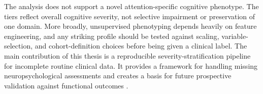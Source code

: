 The analysis does not support a novel attention-specific cognitive phenotype. The tiers reflect overall cognitive severity, not selective impairment or preservation of one domain. More broadly, unsupervised phenotyping depends heavily on feature engineering, and any striking profile should be tested against scaling, variable-selection, and cohort-definition choices before being given a clinical label. The main contribution of this thesis is a reproducible severity-stratification pipeline for incomplete routine clinical data. It provides a framework for handling missing neuropsychological assessments and creates a basis for future prospective validation against functional outcomes \parencite{maas2017traumatic, corrigan2010epidemiology}.
